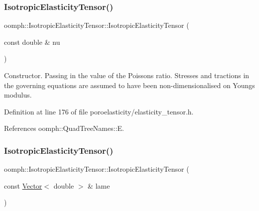 \subsubsection{\texorpdfstring{Isotropic\+Elasticity\+Tensor()}{IsotropicElasticityTensor()}\hspace{0.1cm}{\footnotesize\ttfamily [5/6]}}
{\footnotesize\ttfamily oomph\+::\+Isotropic\+Elasticity\+Tensor\+::\+Isotropic\+Elasticity\+Tensor (\begin{DoxyParamCaption}\item[{const double \&}]{nu }\end{DoxyParamCaption})\hspace{0.3cm}{\ttfamily [inline]}}



Constructor. Passing in the value of the Poisson\textquotesingle{}s ratio. Stresses and tractions in the governing equations are assumed to have been non-\/dimensionalised on Young\textquotesingle{}s modulus. 



Definition at line 176 of file poroelasticity/elasticity\+\_\+tensor.\+h.



References oomph\+::\+Quad\+Tree\+Names\+::E.

\mbox{\label{classoomph_1_1IsotropicElasticityTensor_a0f4785c975f317f98864f28bb977a516}} 
\subsubsection{\texorpdfstring{Isotropic\+Elasticity\+Tensor()}{IsotropicElasticityTensor()}\hspace{0.1cm}{\footnotesize\ttfamily [6/6]}}
{\footnotesize\ttfamily oomph\+::\+Isotropic\+Elasticity\+Tensor\+::\+Isotropic\+Elasticity\+Tensor (\begin{DoxyParamCaption}\item[{const \hyperlink{classoomph_1_1Vector}{Vector}$<$ double $>$ \&}]{lame }\end{DoxyParamCaption})\hspace{0.3cm}{\ttfamily [inline]}}



